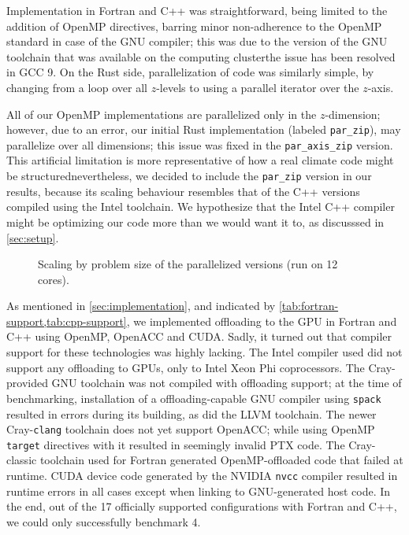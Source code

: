 \documentclass[british]{scrreprt}
\begin{document}
Implementation in Fortran and C++ was straightforward, being limited to the addition of OpenMP directives, barring minor non-adherence to the OpenMP standard in case of the GNU compiler; this was due to the version of the GNU toolchain that was available on the computing cluster\textemdash{}the issue has been resolved in GCC 9. On the Rust side, parallelization of code was similarly simple, by changing from a loop over all \( z \)-levels to using a parallel iterator over the \( z \)-axis.

All of our OpenMP implementations are parallelized only in the \( z \)-dimension; however, due to an error, our initial Rust implementation (labeled \texttt{par\_zip}), may parallelize over all dimensions; this issue was fixed in the \texttt{par\_axis\_zip} version. This artificial limitation is more representative of how a real climate code might be structured\textemdash{}nevertheless, we decided to include the \texttt{par\_zip} version in our results, because its scaling behaviour resembles that of the C++ versions compiled using the Intel toolchain. We hypothesize that the Intel C++ compiler might be optimizing our code more than we would want it to, as discusssed in \cref{sec:setup}.

\begin{figure}
	\centering
	{\sffamily
		
	}
	\caption{Scaling by problem size of the parallelized versions (run on 12 cores).}
	\label{fig:scaling-cpu}
\end{figure}

As mentioned in \cref{sec:implementation}, and indicated by \cref{tab:fortran-support,tab:cpp-support}, we implemented offloading to the GPU in Fortran and C++ using OpenMP, OpenACC and CUDA. Sadly, it turned out that compiler support for these technologies was highly lacking. The Intel compiler used did not support any offloading to GPUs, only to Intel Xeon Phi coprocessors. The Cray-provided GNU toolchain was not compiled with offloading support; at the time of benchmarking, installation of a offloading-capable GNU compiler using \texttt{spack} resulted in errors during its building, as did the LLVM toolchain. The newer Cray-\texttt{clang} toolchain does not yet support OpenACC; while using OpenMP \texttt{target} directives with it resulted in seemingly invalid PTX code. The Cray-classic toolchain used for Fortran generated OpenMP-offloaded code that failed at runtime. CUDA device code generated by the NVIDIA \texttt{nvcc} compiler resulted in runtime errors in all cases except when linking to GNU-generated host code. In the end, out of the 17 officially supported configurations with Fortran and C++, we could only successfully benchmark 4.
\end{document}
